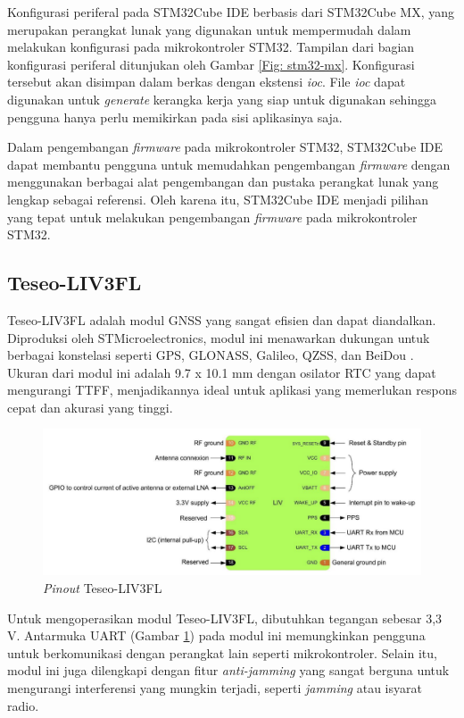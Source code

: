 Konfigurasi periferal pada STM32Cube IDE berbasis dari STM32Cube MX, yang merupakan perangkat lunak yang digunakan untuk mempermudah dalam melakukan konfigurasi pada mikrokontroler STM32. Tampilan dari bagian konfigurasi periferal ditunjukan oleh Gambar \ref{Fig: stm32-mx}. Konfigurasi tersebut akan disimpan dalam berkas dengan ekstensi \textit{ioc}. File \textit{ioc} dapat digunakan untuk \textit{generate} kerangka kerja yang siap untuk digunakan sehingga pengguna hanya perlu memikirkan pada sisi aplikasinya saja.

Dalam pengembangan \textit{firmware} pada mikrokontroler STM32, STM32Cube IDE dapat membantu pengguna untuk memudahkan pengembangan \textit{firmware} dengan menggunakan berbagai alat pengembangan dan pustaka perangkat lunak yang lengkap sebagai referensi. Oleh karena itu, STM32Cube IDE menjadi pilihan yang tepat untuk melakukan pengembangan \textit{firmware} pada mikrokontroler STM32.

\subsection{Teseo\hyp{}LIV3FL}
Teseo\hyp{}LIV3FL adalah modul GNSS yang sangat efisien dan dapat diandalkan. Diproduksi oleh STMicroelectronics, modul ini menawarkan dukungan untuk berbagai konstelasi seperti GPS, GLONASS, Galileo, QZSS, dan BeiDou \cite{STMicroelectronics2022}. Ukuran dari modul ini adalah 9.7 x 10.1 mm dengan osilator RTC yang dapat mengurangi TTFF, menjadikannya ideal untuk aplikasi yang memerlukan respons cepat dan akurasi yang tinggi.

\begin{figure}[H]
	\centering
	\includegraphics[width=13cm]{contents/chapter-2/teseo_pinout.png}
	\caption{\textit{Pinout} Teseo\hyp{}LIV3FL \cite{STMicroelectronics2022}}
	\label{Fig: teseo_pinout}
\end{figure}

Untuk mengoperasikan modul Teseo\hyp{}LIV3FL, dibutuhkan tegangan sebesar 3,3 V. Antarmuka UART (Gambar \ref{Fig: teseo_pinout}) pada modul ini memungkinkan pengguna untuk berkomunikasi dengan perangkat lain seperti mikrokontroler. Selain itu, modul ini juga dilengkapi dengan fitur \textit{anti-jamming} yang sangat berguna untuk mengurangi interferensi yang mungkin terjadi, seperti \textit{jamming} atau isyarat radio.

